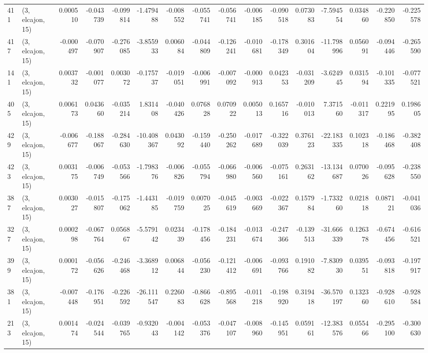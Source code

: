 \begin{tabular}{llrrrrrrrrrrrrrr}
411 &  (3, elcajon, 15) &   0.000510 & -0.043739 & -0.099814 &   -1.479488 & -0.008552 &  -0.055741 & -0.056741 & -0.006185 & -0.090518 &  0.073083 &   -7.594554 &  0.034860 & -0.220850 & -0.225578 \\
417 &  (3, elcajon, 15) &  -0.000497 & -0.070907 & -0.276085 &   -3.855933 &  0.006084 &  -0.044809 & -0.126241 & -0.010681 & -0.178349 &  0.301604 &  -11.798996 &  0.056091 & -0.094446 & -0.265590 \\
141 &  (3, elcajon, 15) &   0.003732 & -0.001077 &  0.003072 &   -0.175737 & -0.019051 &  -0.006991 & -0.007092 & -0.000913 &  0.042353 & -0.031209 &   -3.624945 &  0.031594 & -0.101335 & -0.077521 \\
405 &  (3, elcajon, 15) &   0.006173 &  0.043660 & -0.035214 &    1.831408 & -0.040426 &   0.076828 &  0.070922 &  0.005013 &  0.165716 & -0.010013 &    7.371560 & -0.011317 &  0.221995 &  0.198605 \\
429 &  (3, elcajon, 15) &  -0.006677 & -0.188067 & -0.284630 &  -10.408367 &  0.043092 &  -0.159440 & -0.250262 & -0.017689 & -0.322039 &  0.376123 &  -22.183335 &  0.102318 & -0.186468 & -0.382408 \\
423 &  (3, elcajon, 15) &   0.003175 & -0.006749 & -0.053566 &   -1.798376 & -0.006826 &  -0.055794 & -0.066980 & -0.006560 & -0.075161 &  0.263162 &  -13.134687 &  0.070026 & -0.095628 & -0.238550 \\
387 &  (3, elcajon, 15) &   0.003027 & -0.015807 & -0.175062 &   -1.443185 & -0.019759 &   0.007025 & -0.045619 & -0.003669 & -0.022367 &  0.157984 &   -1.733260 &  0.021818 &  0.087121 & -0.041036 \\
327 &  (3, elcajon, 15) &   0.000298 & -0.067764 &  0.056867 &   -5.579142 &  0.023439 &  -0.178456 & -0.184231 & -0.013674 & -0.247366 & -0.139513 &  -31.666339 &  0.126378 & -0.674456 & -0.616521 \\
399 &  (3, elcajon, 15) &   0.000172 & -0.056626 & -0.246468 &   -3.368912 &  0.006844 &  -0.056230 & -0.121412 & -0.006691 & -0.093766 &  0.191082 &   -7.830930 &  0.039551 & -0.093818 & -0.197917 \\
381 &  (3, elcajon, 15) &  -0.007448 & -0.176951 & -0.226592 &  -26.111547 &  0.226083 &  -0.866628 & -0.895568 & -0.011218 & -0.198920 &  0.319418 &  -36.570197 &  0.132360 & -0.928610 & -0.928584 \\
213 &  (3, elcajon, 15) &   0.001474 & -0.024544 & -0.039765 &   -0.932043 & -0.004142 &  -0.053376 & -0.047107 & -0.008960 & -0.145951 &  0.059161 &  -12.383576 &  0.055466 & -0.295100 & -0.300630 \\

\end{tabular}
